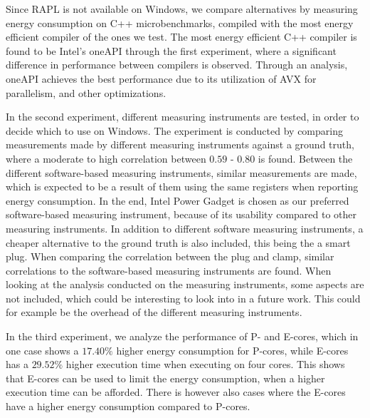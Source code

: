 Since RAPL is not available on Windows, we compare alternatives by measuring energy consumption on C++ microbenchmarks, compiled with the most energy efficient compiler of the ones we test. The most energy efficient C++ compiler is found to be Intel's oneAPI through the first experiment, where a significant difference in performance between compilers is observed. Through an analysis, oneAPI achieves the best performance due to its utilization of AVX for parallelism, and other optimizations.


In the second experiment, different measuring instruments are tested, in order to decide which to use on Windows. The experiment is conducted by comparing measurements made by different measuring instruments against a ground truth, where a moderate to high correlation between $0.59$ - $0.80$ is found. Between the different software-based measuring instruments, similar measurements are made, which is expected to be a result of them using the same registers when reporting energy consumption. In the end, Intel Power Gadget is chosen as our preferred software-based measuring instrument, because of its usability compared to other measuring instruments. In addition to different software measuring instruments, a cheaper alternative to the ground truth is also included, this being the a smart plug. When comparing the correlation between the plug and clamp, similar correlations to the software-based measuring instruments are found. When looking at the analysis conducted on the measuring instruments, some aspects are not included, which could be interesting to look into in a future work. This could for example be the overhead of the different measuring instruments.

In the third experiment, we analyze the performance of P- and E-cores, which in one case shows a $17.40\%$ higher energy consumption for P-cores, while E-cores has a $29.52\%$ higher execution time when executing on four cores. This shows that E-cores can be used to limit the energy consumption, when a higher execution time can be afforded. There is however also cases where the E-cores have a higher energy consumption compared to P-cores.




